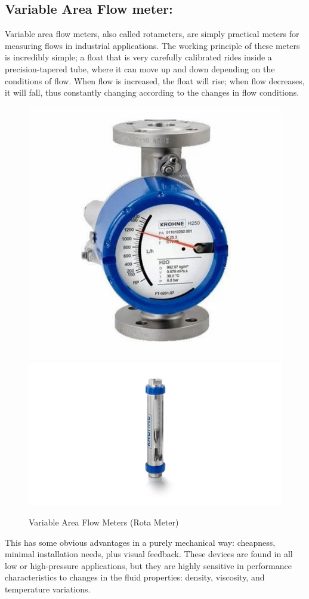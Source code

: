 \subsection{Variable Area Flow meter:}
Variable area flow meters, also called rotameters, are simply practical meters for measuring flows in industrial applications. The working principle of these meters is incredibly simple; a float that is very carefully calibrated rides inside a precision-tapered tube, where it can move up and down depending on the conditions of flow. When flow is increased, the float will rise; when flow decreases, it will fall, thus constantly changing according to the changes in flow conditions.

\begin{figure}[h!]
    \centering
    \includegraphics[width=0.45\linewidth]{figs/flowmeters/image15.jpg}
    \includegraphics[width=0.8\linewidth]{figs/flowmeters/image16.png}
    \caption{Variable Area Flow Meters (Rota Meter)}
    \label{fig:rota_meter}
\end{figure}

This has some obvious advantages in a purely mechanical way: cheapness, minimal installation needs, plus visual feedback. These devices are found in all low or high-pressure applications, but they are highly sensitive in performance characteristics to changes in the fluid properties: density, viscosity, and temperature variations.

